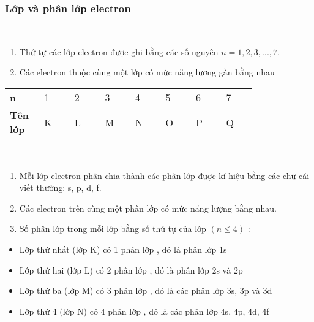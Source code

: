 \subsubsection{Lớp và phân lớp electron}
\\
\begin{tomtat}
	\begin{enumerate}
		\item Thứ tự các lớp electron được ghi bằng các số nguyên $n=1, 2, 3, ... , 7$.
		\item Các electron thuộc cùng một lớp có mức năng lương gần bằng nhau
	\end{enumerate}
\end{tomtat}
\vspace{0.5cm}
\begin{center}
	\begin{tabular}{C{0.1\linewidth}*{7}{C{0.1\linewidth}}}
		\textbf{n}&1&2&3&4&5&6&7\\
		\textbf{Tên lớp} &K&L&M&N&O&P&Q
	\end{tabular}
\end{center}
\\
\begin{tomtat}
	\begin{enumerate}
		\item  Mỗi lớp electron phân chia thành các phân lớp được kí hiệu bằng các chữ cái viết thường: s, p, d, f.
		\item  Các electron trên cùng một phân lớp có mức năng lượng bằng nhau.
		\item  Số phân lớp trong mỗi lớp bằng số thứ tự của lớp $(n \leq 4)$ :
	\end{enumerate}
\end{tomtat}
\begin{vidu}
	\begin{itemize}
		\item Lớp thứ nhất (lớp K) có 1 phân lớp , đó là phân lớp 1s
		\item Lớp thứ hai (lớp L) có 2 phân lớp , đó là phân lớp 2s và 2p
		\item Lớp thứ ba (lớp M) có 3 phân lớp , đó là các phân lớp 3s, 3p và 3d
		\item Lớp thứ 4 (lớp N) có 4 phân lớp , đó là các phân lớp 4s, 4p, 4d, 4f
	\end{itemize}
\end{vidu}
